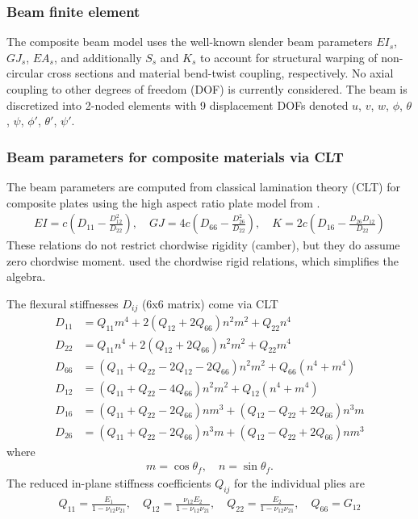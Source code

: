 \documentclass[10pt]{article}
\newcommand{\be}{\begin{eqnarray}}
\newcommand{\ee}{\end{eqnarray}}
\begin{document}
\subsubsection{Beam finite element}
% 
The composite beam model uses the well-known slender beam parameters $EI_s$, $GJ_s$, $EA_s$, and additionally $S_s$ and $K_s$ to account for structural warping of non-circular cross sections and material bend-twist coupling, respectively.
No axial coupling to other degrees of freedom (DOF) is currently considered.
The beam is discretized into 2-noded elements with 9 displacement DOFs denoted $u$, $v$, $w$, $\phi$, $\theta$, $\psi$, $\phi'$, $\theta'$, $\psi'$.
% 
\subsubsection{Beam parameters for composite materials via CLT}
% 
The beam parameters are computed from classical lamination theory (CLT) for composite plates using the high aspect ratio plate model from \citet{Weisshaar1985}.
\be
EI = c\left( D_{11} - \frac{D_{12}^2}{D_{22}}\right)      , \quad
GJ = 4c \left(D_{66} - \frac{D_{26}^2}{D_{22}}\right)     , \quad
K  = 2c \left(D_{16} - \frac{D_{26}D_{12}}{D_{22}}\right)
\ee
These relations do not restrict chordwise rigidity (camber), but they do assume zero chordwise moment.
\citet{LOTTATI1985} used the chordwise rigid relations, which simplifies the algebra.

The flexural stiffnesses $D_{ij}$ (6x6 matrix) come via CLT
\begin{align}
    D_{11} & = Q_{11}m^4 + 2\left( Q_{12}+2Q_{66}\right)n^2m^2 + Q_{22}n^4                               \\
    D_{22} & = Q_{11}n^4+2\left( Q_{12} + 2Q_{66}\right)n^2m^2 + Q_{22}m^4                               \\
    D_{66} & = \left(Q_{11} +Q_{22} - 2Q_{12}-2Q_{66}\right)n^2m^2 + Q_{66}\left( n^4 + m^4 \right)      \\
    D_{12} & = \left(Q_{11} +Q_{22} - 4Q_{66}\right)n^2 m^2 + Q_{12}\left( n^4 + m^4 \right)             \\
    D_{16} & = \left(Q_{11} +Q_{22} - 2Q_{66}\right)n m^3 + \left(Q_{12} - Q_{22} + 2Q_{66}\right) n^3 m \\
    D_{26} & = \left(Q_{11} +Q_{22} - 2Q_{66}\right)n^3 m + \left(Q_{12} - Q_{22} + 2Q_{66}\right) n m^3
\end{align}
where
\be
m= \cos\theta_f,
\quad
n= \sin\theta_f.
\ee
%
The reduced in-plane stiffness coefficients $Q_{ij}$ for the individual plies are
%
\be
Q_{11} = \frac{E_1}{1-\nu_{12}\nu_{21}}, \quad
Q_{12} = \frac{\nu_{12} E_2}{1-\nu_{12}\nu_{21}}, \quad
Q_{22} = \frac{E_2}{1-\nu_{12}\nu_{21}}, \quad
Q_{66} = G_{12}
\ee
\end{document}
